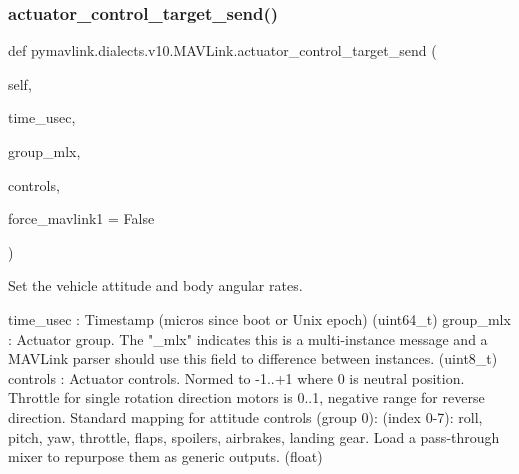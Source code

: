 \subsubsection{\texorpdfstring{actuator\+\_\+control\+\_\+target\+\_\+send()}{actuator\_control\_target\_send()}}
{\footnotesize\ttfamily def pymavlink.\+dialects.\+v10.\+M\+A\+V\+Link.\+actuator\+\_\+control\+\_\+target\+\_\+send (\begin{DoxyParamCaption}\item[{}]{self,  }\item[{}]{time\+\_\+usec,  }\item[{}]{group\+\_\+mlx,  }\item[{}]{controls,  }\item[{}]{force\+\_\+mavlink1 = {\ttfamily False} }\end{DoxyParamCaption})}

\begin{DoxyVerb}Set the vehicle attitude and body angular rates.

time_usec                 : Timestamp (micros since boot or Unix epoch) (uint64_t)
group_mlx                 : Actuator group. The "_mlx" indicates this is a multi-instance message and a MAVLink parser should use this field to difference between instances. (uint8_t)
controls                  : Actuator controls. Normed to -1..+1 where 0 is neutral position. Throttle for single rotation direction motors is 0..1, negative range for reverse direction. Standard mapping for attitude controls (group 0): (index 0-7): roll, pitch, yaw, throttle, flaps, spoilers, airbrakes, landing gear. Load a pass-through mixer to repurpose them as generic outputs. (float)\end{DoxyVerb}
 \mbox{\label{classpymavlink_1_1dialects_1_1v10_1_1MAVLink_a50d042591843469808016d3104937809}} 
